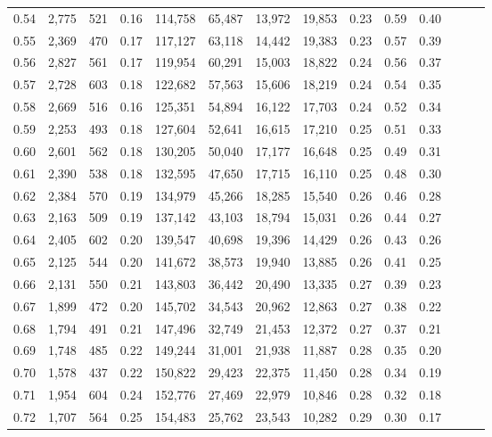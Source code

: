 \begin{tabular}{rrrrrrrrrrrrrr}
0.54 &  2,775 &  521 &  0.16 &  114,758 &   65,487 &  13,972 &  19,853 &  0.23 &  0.59 &      0.40 \\
0.55 &  2,369 &  470 &  0.17 &  117,127 &   63,118 &  14,442 &  19,383 &  0.23 &  0.57 &      0.39 \\
0.56 &  2,827 &  561 &  0.17 &  119,954 &   60,291 &  15,003 &  18,822 &  0.24 &  0.56 &      0.37 \\
0.57 &  2,728 &  603 &  0.18 &  122,682 &   57,563 &  15,606 &  18,219 &  0.24 &  0.54 &      0.35 \\
0.58 &  2,669 &  516 &  0.16 &  125,351 &   54,894 &  16,122 &  17,703 &  0.24 &  0.52 &      0.34 \\
0.59 &  2,253 &  493 &  0.18 &  127,604 &   52,641 &  16,615 &  17,210 &  0.25 &  0.51 &      0.33 \\
0.60 &  2,601 &  562 &  0.18 &  130,205 &   50,040 &  17,177 &  16,648 &  0.25 &  0.49 &      0.31 \\
0.61 &  2,390 &  538 &  0.18 &  132,595 &   47,650 &  17,715 &  16,110 &  0.25 &  0.48 &      0.30 \\
0.62 &  2,384 &  570 &  0.19 &  134,979 &   45,266 &  18,285 &  15,540 &  0.26 &  0.46 &      0.28 \\
0.63 &  2,163 &  509 &  0.19 &  137,142 &   43,103 &  18,794 &  15,031 &  0.26 &  0.44 &      0.27 \\
0.64 &  2,405 &  602 &  0.20 &  139,547 &   40,698 &  19,396 &  14,429 &  0.26 &  0.43 &      0.26 \\
0.65 &  2,125 &  544 &  0.20 &  141,672 &   38,573 &  19,940 &  13,885 &  0.26 &  0.41 &      0.25 \\
0.66 &  2,131 &  550 &  0.21 &  143,803 &   36,442 &  20,490 &  13,335 &  0.27 &  0.39 &      0.23 \\
0.67 &  1,899 &  472 &  0.20 &  145,702 &   34,543 &  20,962 &  12,863 &  0.27 &  0.38 &      0.22 \\
0.68 &  1,794 &  491 &  0.21 &  147,496 &   32,749 &  21,453 &  12,372 &  0.27 &  0.37 &      0.21 \\
0.69 &  1,748 &  485 &  0.22 &  149,244 &   31,001 &  21,938 &  11,887 &  0.28 &  0.35 &      0.20 \\
0.70 &  1,578 &  437 &  0.22 &  150,822 &   29,423 &  22,375 &  11,450 &  0.28 &  0.34 &      0.19 \\
0.71 &  1,954 &  604 &  0.24 &  152,776 &   27,469 &  22,979 &  10,846 &  0.28 &  0.32 &      0.18 \\
0.72 &  1,707 &  564 &  0.25 &  154,483 &   25,762 &  23,543 &  10,282 &  0.29 &  0.30 &      0.17 \\

\end{tabular}
